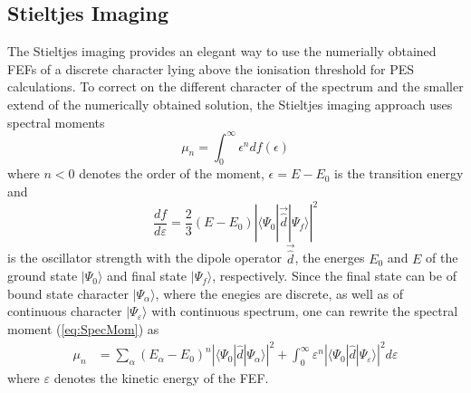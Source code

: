 \subsection{Stieltjes Imaging}
\label{ch:stieltjes}
The Stieltjes imaging \cite{stieltjesCeder,langhoff3,stieltjeLanczos,langhoff} provides an elegant way to use the numerially obtained FEFs of a discrete character lying above the ionisation threshold for PES calculations.%
To correct on the different character of the spectrum and the smaller extend of the numerically obtained solution, the Stieltjes imaging approach uses spectral moments \cite{langhoff2}
\begin{equation} \label{eq:SpecMom}
\mu_n=\int_0^\infty \epsilon^n df(\epsilon)
\end{equation}
where $n<0$ denotes the order of the moment, $\epsilon=E-E_0$ is the transition energy and 
\begin{equation}
\frac{df}{d\varepsilon}=\frac 23 (E-E_0) \left|\langle \Psi_0 |\vec{\hat{d}}|\Psi_f \rangle \right|^2
\end{equation}
is the oscillator strength with the dipole operator $\vec{\hat{d}}$, the energes $E_0$ and $E$ of the ground state $|\Psi_0\rangle$ and final state $|\Psi_f\rangle$, respectively.
Since the final state can be of bound state character $|\Psi_\alpha\rangle$, where the enegies are discrete, as well as of continuous character $|\Psi_\varepsilon\rangle$ with continuous spectrum, one can rewrite the spectral moment (\ref{eq:SpecMom}) as \cite{langhoff3} 
\begin{align}\label{eq:M_n_ana}
   \mu_n&=
      \sum_\alpha \left(E_\alpha-E_0\right)^n \left|\langle \Psi_0 | \hat{d}| \Psi_\alpha\rangle \right|^2 + 
         \int_{0}^\infty \varepsilon^n \left|\langle \Psi_0 | \hat{d}| \Psi_\varepsilon\rangle \right|^2 d \varepsilon
\end{align}
where $\varepsilon$ denotes the kinetic energy of the FEF.
